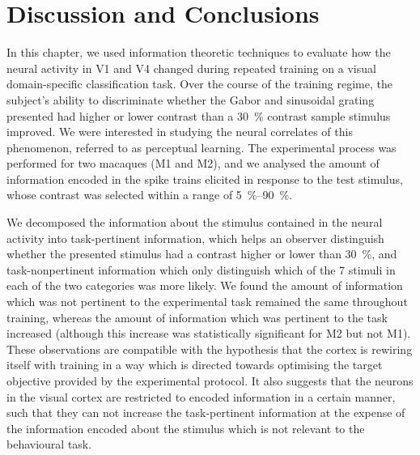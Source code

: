 \section{Discussion and Conclusions}

In this chapter, we used information theoretic techniques to evaluate how the neural activity in \ac{V1} and \ac{V4} changed during repeated training on a visual domain-specific classification task.
Over the course of the training regime, the subject's ability to discriminate whether the Gabor and sinusoidal grating presented had higher or lower contrast than a \SI{30}{\percent} contrast sample stimulus improved.
We were interested in studying the neural correlates of this phenomenon, referred to as perceptual learning.
The experimental process was performed for two macaques (\ac{M1} and \ac{M2}), and we analysed the amount of information encoded in the spike trains elicited in response to the test stimulus, whose contrast was selected within a range of \SIrange{5}{90}{\percent}.

We decomposed the information about the stimulus contained in the neural activity into task-pertinent information, which helps an observer distinguish whether the presented stimulus had a contrast higher or lower than \SI{30}{\percent}, and task-nonpertinent information which only distinguish which of the \num{7} stimuli in each of the two categories was more likely.
We found the amount of information which was not pertinent to the experimental task remained the same throughout training, whereas the amount of information which was pertinent to the task increased (although this increase was statistically significant for \ac{M2} but not \ac{M1}).
These observations are compatible with the hypothesis that the cortex is rewiring itself with training in a way which is directed towards optimising the target objective provided by the experimental protocol.
It also suggests that the neurons in the visual cortex are restricted to encoded information in a certain manner, such that they can not increase the task-pertinent information at the expense of the information encoded about the stimulus which is not relevant to the behavioural task.

